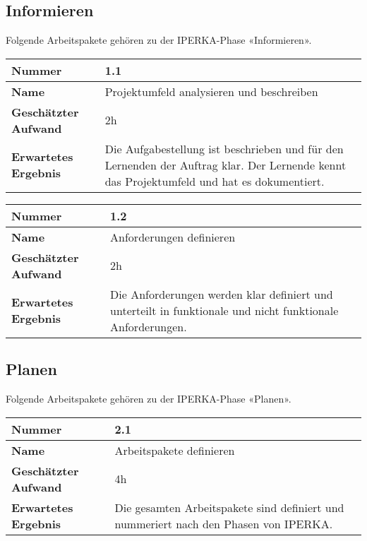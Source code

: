 \subsection{Informieren}
Folgende Arbeitspakete gehören zu der IPERKA-Phase «Informieren».

\begin{longtable}{p{}|p{}}
	\hline
	\textbf{Nummer}                 & \textbf{1.1}            \\
	\hline
	\textbf{Name}   				& Projektumfeld analysieren und beschreiben                  \\
	\hline
	\textbf{Geschätzter Aufwand}    & 2h                                    \\
	\hline
	\textbf{Erwartetes Ergebnis}    & Die Aufgabestellung ist beschrieben und für den Lernenden der Auftrag klar. Der Lernende kennt das Projektumfeld und hat es dokumentiert.                                    \\
	\hline
\end{longtable}\label{tab:informieren-1.1}

\begin{longtable}{p{}|p{}}
	\hline
	\textbf{Nummer}                 & \textbf{1.2}            \\
	\hline
	\textbf{Name}   				& Anforderungen definieren                  \\
	\hline
	\textbf{Geschätzter Aufwand}    & 2h                                    \\
	\hline
	\textbf{Erwartetes Ergebnis}    & Die Anforderungen werden klar definiert und unterteilt in funktionale und nicht funktionale Anforderungen.                                    \\
	\hline
\end{longtable}\label{tab:informieren-1.2}

\subsection{Planen}
Folgende Arbeitspakete gehören zu der IPERKA-Phase «Planen».

\begin{longtable}{p{}|p{}}
	\hline
	\textbf{Nummer}                 & \textbf{2.1}            \\
	\hline
	\textbf{Name}   				& Arbeitspakete definieren                  \\
	\hline
	\textbf{Geschätzter Aufwand}    & 4h                                    \\
	\hline
	\textbf{Erwartetes Ergebnis}    & Die gesamten Arbeitspakete sind definiert und nummeriert nach den Phasen von IPERKA.                                    \\
	\hline
\end{longtable}\label{tab:planen-2.1}

